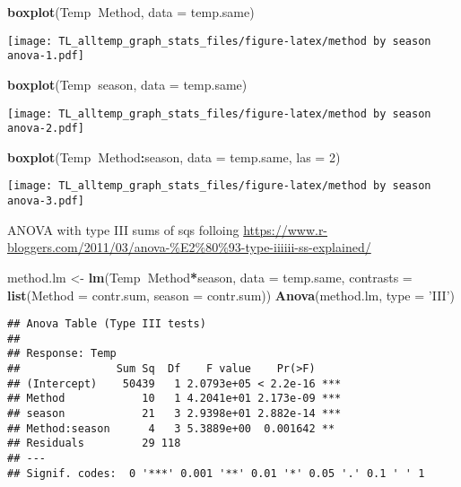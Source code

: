 \documentclass[
]{article}
\newenvironment{Shaded}{\begin{snugshade}}{\end{snugshade}}
\newcommand{\DataTypeTok}[1]{\textcolor[rgb]{0.13,0.29,0.53}{#1}}
\newcommand{\DecValTok}[1]{\textcolor[rgb]{0.00,0.00,0.81}{#1}}
\newcommand{\KeywordTok}[1]{\textcolor[rgb]{0.13,0.29,0.53}{\textbf{#1}}}
\newcommand{\NormalTok}[1]{#1}
\newcommand{\OperatorTok}[1]{\textcolor[rgb]{0.81,0.36,0.00}{\textbf{#1}}}
\newcommand{\StringTok}[1]{\textcolor[rgb]{0.31,0.60,0.02}{#1}}
\begin{document}
\begin{Shaded}
\begin{Highlighting}[]
\KeywordTok{boxplot}\NormalTok{(Temp}\OperatorTok{~}\NormalTok{Method, }\DataTypeTok{data =}\NormalTok{ temp.same)}
\end{Highlighting}
\end{Shaded}

\texttt{[image: TL\_alltemp\_graph\_stats\_files/figure-latex/method by season anova-1.pdf]}

\begin{Shaded}
\begin{Highlighting}[]
\KeywordTok{boxplot}\NormalTok{(Temp}\OperatorTok{~}\NormalTok{season, }\DataTypeTok{data =}\NormalTok{ temp.same)}
\end{Highlighting}
\end{Shaded}

\texttt{[image: TL\_alltemp\_graph\_stats\_files/figure-latex/method by season anova-2.pdf]}

\begin{Shaded}
\begin{Highlighting}[]
\KeywordTok{boxplot}\NormalTok{(Temp}\OperatorTok{~}\NormalTok{Method}\OperatorTok{:}\NormalTok{season, }\DataTypeTok{data =}\NormalTok{ temp.same, }\DataTypeTok{las =} \DecValTok{2}\NormalTok{)}
\end{Highlighting}
\end{Shaded}

\texttt{[image: TL\_alltemp\_graph\_stats\_files/figure-latex/method by season anova-3.pdf]}

ANOVA with type III sums of sqs folloing
\url{https://www.r-bloggers.com/2011/03/anova-\%E2\%80\%93-type-iiiiii-ss-explained/}

\begin{Shaded}
\begin{Highlighting}[]
\NormalTok{method.lm <-}\StringTok{ }\KeywordTok{lm}\NormalTok{(Temp}\OperatorTok{~}\NormalTok{Method}\OperatorTok{*}\NormalTok{season, }\DataTypeTok{data =}\NormalTok{ temp.same, }\DataTypeTok{contrasts =} \KeywordTok{list}\NormalTok{(}\DataTypeTok{Method =}\NormalTok{ contr.sum, }\DataTypeTok{season =}\NormalTok{ contr.sum))}
\KeywordTok{Anova}\NormalTok{(method.lm, }\DataTypeTok{type =} \StringTok{'III'}\NormalTok{)}
\end{Highlighting}
\end{Shaded}

\begin{verbatim}
## Anova Table (Type III tests)
## 
## Response: Temp
##               Sum Sq  Df    F value    Pr(>F)    
## (Intercept)    50439   1 2.0793e+05 < 2.2e-16 ***
## Method            10   1 4.2041e+01 2.173e-09 ***
## season            21   3 2.9398e+01 2.882e-14 ***
## Method:season      4   3 5.3889e+00  0.001642 ** 
## Residuals         29 118                         
## ---
## Signif. codes:  0 '***' 0.001 '**' 0.01 '*' 0.05 '.' 0.1 ' ' 1
\end{verbatim}
\end{document}
